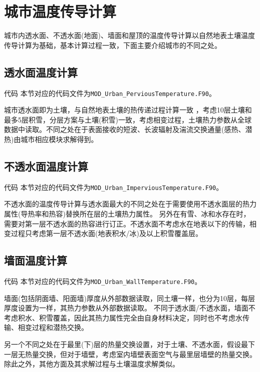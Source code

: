 \section{城市温度传导计算}
城市内透水面、不透水面(地面)、墙面和屋顶的温度传导计算以自然地表土壤温度传导计算为基础，基本计算过程一致，下面主要介绍城市的不同之处。

\subsection{透水面温度计算}
\begin{mymdframed}{代码}
  本节对应的代码文件为\texttt{MOD\_Urban\_PerviousTemperature.F90}。
\end{mymdframed}

城市透水面即为土壤，与自然地表土壤的热传递过程计算一致 ，考虑10层土壤和最多5层积雪，分层方案与土壤(积雪)一致，考虑相变过程，土壤热力参数从全球数据中读取。不同之处在于表面接收的短波、长波辐射及湍流交换通量(感热、潜热)由城市相应模块求解得到。

\subsection{不透水面温度计算}
\begin{mymdframed}{代码}
  本节对应的代码文件为\texttt{MOD\_Urban\_ImperviousTemperature.F90}。
\end{mymdframed}

不透水面的温度传导计算与透水面最大的不同之处在于需要使用不透水面层的热力属性(导热率和热容)替换所在层的土壤热力属性。
另外在有雪、冰和水存在时，需要对第一层不透水面的热容进行订正。不透水面不考虑水在地表以下的传输，相变过程只考虑第一层不透水面(地表积水/冰)及以上积雪覆盖层。

\subsection{墙面温度计算}

\begin{mymdframed}{代码}
  本节对应的代码文件为\texttt{MOD\_Urban\_WallTemperature.F90}。
\end{mymdframed}

墙面(包括阴面墙、阳面墙)厚度从外部数据读取，同土壤一样，也分为10层，每层厚度设置为一样，其热力参数从外部数据读取。
不同于透水面/不透水面，墙面不考虑积水、积雪覆盖，因此其热力属性完全由自身材料决定，同时也不考虑水传输、相变过程和潜热交换。

另一个不同之处在于最里(下)层的热量交换设置，对于土壤、不透水面，假设最下一层无热量交换，但对于墙壁，考虑室内墙壁表面空气与最里层墙壁的热量交换。除此之外，其他方面及其求解过程与土壤温度求解类似。


